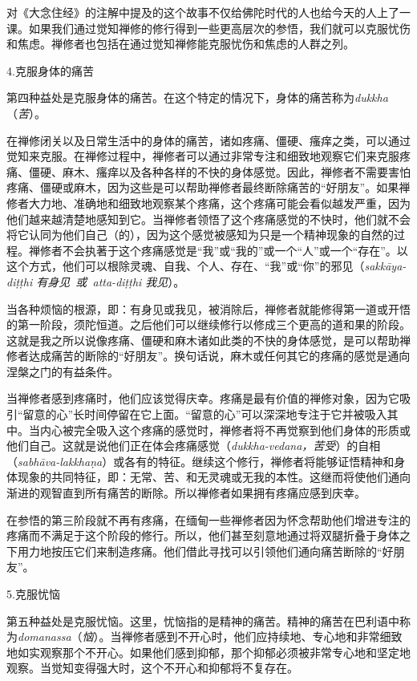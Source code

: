 对《大念住经》的注解中提及的这个故事不仅给佛陀时代的人也给今天的人上了一课。如果我们通过觉知禅修的修行得到一些更高层次的参悟，我们就可以克服忧伤和焦虑。禅修者也包括在通过觉知禅修能克服忧伤和焦虑的人群之列。

\sssubsectnon 4.克服身体的痛苦

第四种益处是克服身体的痛苦。在这个特定的情况下，身体的痛苦称为{\it dukkha}（{\it 苦}）。

在禅修闭关以及日常生活中的身体的痛苦，诸如疼痛、僵硬、瘙痒之类，可以通过觉知来克服。在禅修过程中，禅修者可以通过非常专注和细致地观察它们来克服疼痛、僵硬、\1麻木、瘙痒以及各种各样的不快的身体感觉。因此，禅修者不需要害怕疼痛、僵硬或麻木，因为这些是可以帮助禅修者最终断除痛苦的“好朋友”。如果禅修者大力地、准确地和细致地观察某个疼痛，这个疼痛可能会看似越发严重，因为他们越来越清楚地感知到它。当禅修者领悟了这个疼痛感觉的不快时，他们就不会将它认同为他们自己（的），因为这个感觉被感知为只是一个精神现象的自然的过程。禅修者不会执著于这个疼痛感觉是“我”或“我的”或一个“人”或一个“存在”。以这个方式，他们可以根除灵魂、自我、个人、存在、“我”或“你”的邪见（{\it sakk\=aya-di\d t\d thi 有身见\ 或\ atta-di\d t\d thi 我见}）。

当各种烦恼的根源，即：有身见或我见，被消除后，禅修者就能修得第一道或开悟的第一阶段，须陀恒道。之后他们可以继续修行以修成三个更高的道和果的阶段。这就是我之所以说像疼痛、僵硬和麻木诸如此类的不快的身体感觉，是可以帮助禅修者达成痛苦的断除的“好朋友”。换句话说，麻木或任何其它的疼痛的感觉是通向涅槃之门的有益条件。

当禅修者感到疼痛时，他们应该觉得庆幸。疼痛是最有价值的禅修对象，因为它吸引“留意的心”长时间停留在它上面。“留意的心”可以深深地专注于它并被吸入其中。当内心被完全吸入这个疼痛的感觉时，禅修者将\1不再觉察到他们身体的形质或他们自己。这就是说他们正在体会疼痛感觉（{\it dukkha-vedana，苦受}）的自相（{\it sabh\=ava-lakkha\d na}）或各有的特征。继续这个修行，禅修者将能够证悟精神和身体现象的共同特征，即：无常、苦、和无灵魂或无我的本性。这继而将使他们通向渐进的观智直到所有痛苦的断除。所以禅修者如果拥有疼痛应感到庆幸。

在参悟的第三阶段就不再有疼痛，在缅甸一些禅修者因为怀念帮助他们增进专注的疼痛而不满足于这个阶段的修行。所以，他们甚至刻意地通过将双腿折叠于身体之下用力地按压它们来制造疼痛。他们借此寻找可以引领他们通向痛苦断除的“好朋友”。

\sssubsectnon 5.克服忧恼

第五种益处是克服忧恼。这里，忧恼指的是精神的痛苦。精神的痛苦在巴利语中称为{\it domanassa}（{\it 恼}）。当禅修者感到不开心时，他们应持续地、专心地和非常细致地如实观察那个不开心。如果他们感到抑郁，那个抑郁必须被非常专心地和坚定地观察。当觉知变得强大时，这个不开心和抑郁将不复存在。

